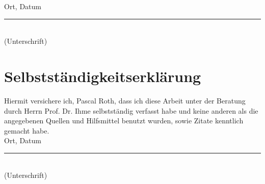 Ort, Datum \hfill \rule{5cm}{0.4pt} \\
\hfill (Unterschrift)

\newpage
\section*{Selbstständigkeitserklärung}
Hiermit versichere ich, Pascal Roth, dass ich diese Arbeit unter der Beratung durch Herrn Prof. Dr. Ihme selbstständig verfasst habe und keine anderen als die angegebenen Quellen und Hilfsmittel benutzt wurden, sowie Zitate kenntlich gemacht habe. \\[2cm]

Ort, Datum \hfill \rule{5cm}{0.4pt} \\
\hfill (Unterschrift)

\newpage

